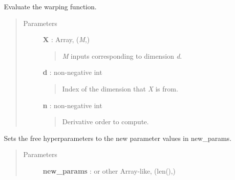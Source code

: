\documentclass[letterpaper,10pt,english]{sphinxmanual}
\begin{document}
\begin{fulllineitems}
\begin{quote}
\begin{description}
\end{description}\end{quote}

\begin{fulllineitems}
\label{gptools.kernel:gptools.kernel.warping.WarpingFunction.__call__}
Evaluate the warping function.
\begin{quote}\begin{description}
\item[{Parameters}] \leavevmode
\textbf{X} : Array, (\emph{M},)
\begin{quote}

\emph{M} inputs corresponding to dimension \emph{d}.
\end{quote}

\textbf{d} : non-negative int
\begin{quote}

Index of the dimension that \emph{X} is from.
\end{quote}

\textbf{n} : non-negative int
\begin{quote}

Derivative order to compute.
\end{quote}

\end{description}\end{quote}

\end{fulllineitems}


\begin{fulllineitems}
\label{gptools.kernel:gptools.kernel.warping.WarpingFunction.param_bounds}
\end{fulllineitems}


\begin{fulllineitems}
\label{gptools.kernel:gptools.kernel.warping.WarpingFunction.set_hyperparams}
Sets the free hyperparameters to the new parameter values in new\_params.
\begin{quote}\begin{description}
\item[{Parameters}] \leavevmode
\textbf{new\_params} :  or other Array-like, (len(),)
\begin{quote}


\end{quote}
\end{description}
\end{quote}
\end{fulllineitems}
\end{fulllineitems}
\end{document}
